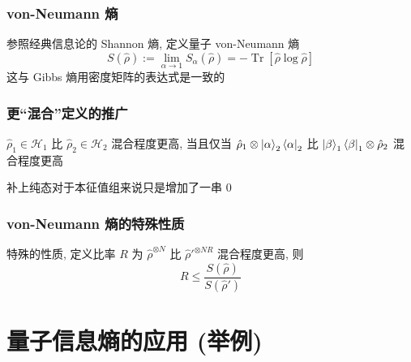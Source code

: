 \documentclass[12pt,hyperref={CJKbookmarks=true}]{beamer}
\newcommand{\Tr}{\operatorname{Tr}}
\begin{document}
\begin{frame}
    \frametitle{von-Neumann 熵}
    参照经典信息论的 Shannon 熵, 定义量子 von-Neumann 熵\cite{neumann1932mathematische}
    \begin{equation}
        S(\hat\rho):=\lim_{\alpha\to 1}S_\alpha(\hat\rho) = -\Tr[\hat\rho\log\hat\rho]
    \end{equation}
    这与 Gibbs 熵用密度矩阵的表达式是一致的
\end{frame}
\begin{frame}\frametitle{更``混合''定义的推广}
    \begin{definition}
        $\hat\rho_1\in\mathcal H_1$ 比 $\hat\rho_2\in\mathcal H_2$ 混合程度更高, 
        当且仅当 $\hat\rho_1\otimes\ket\alpha_2\bra\alpha_2$ 比 
        $\ket\beta_1\bra\beta_1\otimes\hat\rho_2$ 混合程度更高
    \end{definition}\pause
    补上纯态对于本征值组来说只是增加了一串 $0$
\end{frame}
\begin{frame}
    \frametitle{von-Neumann 熵的特殊性质}
    特殊的性质, 定义比率 $R$ 为 $\hat\rho^{\otimes N}$ 
    比 $\hat\rho'^{\otimes NR}$ 混合程度更高, 则
    \begin{equation}
        R \le \frac{S(\hat\rho)}{S(\hat\rho')}
    \end{equation}
\end{frame}

\section{量子信息熵的应用 (举例)} %
\label{sec:Quantum_info_entropy}
\begin{frame}
    \tableofcontents[currentsection]
\end{frame}
\end{document}
